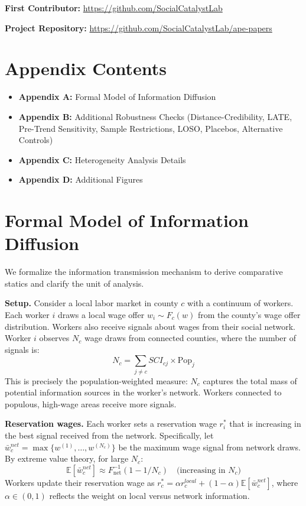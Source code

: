 \documentclass[12pt]{article}
\newcommand{\E}{\mathbb{E}}
\begin{document}
\noindent\textbf{First Contributor:} \url{https://github.com/SocialCatalystLab}

\noindent\textbf{Project Repository:} \url{https://github.com/SocialCatalystLab/ape-papers}


\clearpage
\appendix

\section*{Appendix Contents}
\begin{itemize}
\item \textbf{Appendix A:} Formal Model of Information Diffusion
\item \textbf{Appendix B:} Additional Robustness Checks (Distance-Credibility, LATE, Pre-Trend Sensitivity, Sample Restrictions, LOSO, Placebos, Alternative Controls)
\item \textbf{Appendix C:} Heterogeneity Analysis Details
\item \textbf{Appendix D:} Additional Figures
\end{itemize}

\section{Formal Model of Information Diffusion}
\label{sec:formal_model_appendix}

We formalize the information transmission mechanism to derive comparative statics and clarify the unit of analysis.

\textbf{Setup.} Consider a local labor market in county $c$ with a continuum of workers. Each worker $i$ draws a local wage offer $w_i \sim F_c(w)$ from the county's wage offer distribution. Workers also receive signals about wages from their social network. Worker $i$ observes $N_c$ wage draws from connected counties, where the number of signals is:
\begin{equation}
N_c = \sum_{j \neq c} SCI_{cj} \times \text{Pop}_j
\end{equation}
This is precisely the population-weighted measure: $N_c$ captures the total mass of potential information sources in the worker's network. Workers connected to populous, high-wage areas receive more signals.

\textbf{Reservation wages.} Each worker sets a reservation wage $r^*_i$ that is increasing in the best signal received from the network. Specifically, let $\bar{w}^{net}_c = \max\{w^{(1)}, \ldots, w^{(N_c)}\}$ be the maximum wage signal from network draws. By extreme value theory, for large $N_c$:
\begin{equation}
\E[\bar{w}^{net}_c] \approx F^{-1}_{\text{net}}(1 - 1/N_c) \quad \text{(increasing in } N_c\text{)}
\end{equation}
Workers update their reservation wage as $r^*_c = \alpha r^{local}_c + (1-\alpha) \E[\bar{w}^{net}_c]$, where $\alpha \in (0,1)$ reflects the weight on local versus network information.
\end{document}
